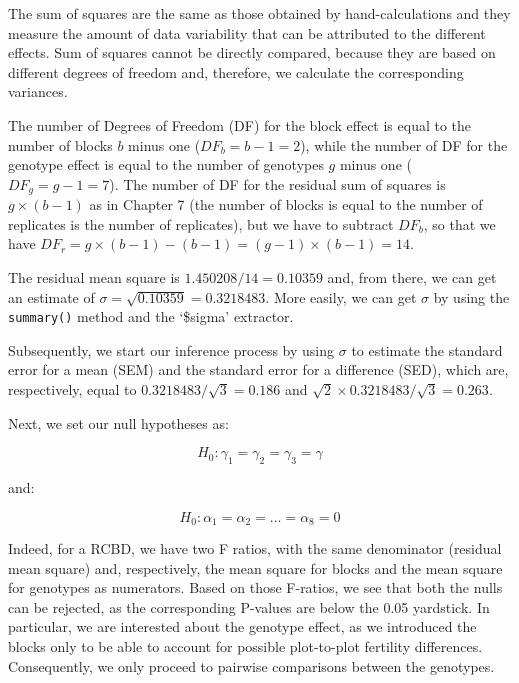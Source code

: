 \documentclass[a4paper,12pt,oneside]{book}
\newenvironment{Shaded}{\begin{snugshade}}{\end{snugshade}}
\newcommand{\SpecialCharTok}[1]{#1}
\newcommand{\DocumentationTok}[1]{#1}
\newcommand{\FunctionTok}[1]{#1}
\newcommand{\NormalTok}[1]{#1}
\begin{document}
The sum of squares are the same as those obtained by hand-calculations and they measure the amount of data variability that can be attributed to the different effects. Sum of squares cannot be directly compared, because they are based on different degrees of freedom and, therefore, we calculate the corresponding variances.

The number of Degrees of Freedom (DF) for the block effect is equal to the number of blocks \(b\) minus one (\(DF_b = b - 1 = 2\)), while the number of DF for the genotype effect is equal to the number of genotypes \(g\) minus one (\(DF_g = g - 1 = 7\)). The number of DF for the residual sum of squares is \(g \times (b - 1)\) as in Chapter 7 (the number of blocks is equal to the number of replicates is the number of replicates), but we have to subtract \(DF_b\), so that we have \(DF_r = g \times (b - 1) - (b - 1) = (g - 1) \times (b - 1) = 14\).

The residual mean square is \(1.450208/14 = 0.10359\) and, from there, we can get an estimate of \(\sigma = \sqrt{0.10359} = 0.3218483\). More easily, we can get \(\sigma\) by using the \texttt{summary()} method and the `\$sigma' extractor.

\vspace{12pt}

\begin{Shaded}
\end{Shaded}

Subsequently, we start our inference process by using \(\sigma\) to estimate the standard error for a mean (SEM) and the standard error for a difference (SED), which are, respectively, equal to \(0.3218483/\sqrt{3} = 0.186\) and \(\sqrt{2} \times 0.3218483/\sqrt{3} = 0.263\).

Next, we set our null hypotheses as:

\[H_0: \gamma_1 = \gamma_2 = \gamma_3 = \gamma\]

and:

\[H_0: \alpha_1 = \alpha_2 = ... = \alpha_8 = 0\]

Indeed, for a RCBD, we have two F ratios, with the same denominator (residual mean square) and, respectively, the mean square for blocks and the mean square for genotypes as numerators. Based on those F-ratios, we see that both the nulls can be rejected, as the corresponding P-values are below the 0.05 yardstick. In particular, we are interested about the genotype effect, as we introduced the blocks only to be able to account for possible plot-to-plot fertility differences. Consequently, we only proceed to pairwise comparisons between the genotypes.
\end{document}
